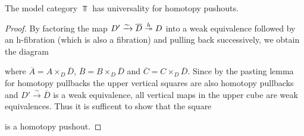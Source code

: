 \begin{prop}\label{lem:topUniversalPo}
    The model category $\Top$ has universality for homotopy pushouts.
    \begin{proof}
        By factoring the map $D'\xrightarrow{\sim}\overline{D}\xtwoheadrightarrow{h} D$ into a weak equivalence followed by an h-fibration (which is also a fibration) and pulling back successively, we obtain the diagram %
        \begin{center}
        \end{center}
        where $\overline{A}=A\times_{D}\overline{D}$, $\overline{B}=B\times_{D}\overline{D}$ and $\overline{C}=C\times_{D}\overline{D}$.
        Since by the pasting lemma for homotopy pullbacks the upper vertical squares are also homotopy pullbacks and $D'\xrightarrow{\sim}\overline{D}$ is a weak equivalence, all vertical maps in the upper cube are weak equivalences.
        Thus it is sufficent to show that the square
        \begin{center}
        \end{center}
        is a homotopy pushout.


\end{proof}
\end{prop}
